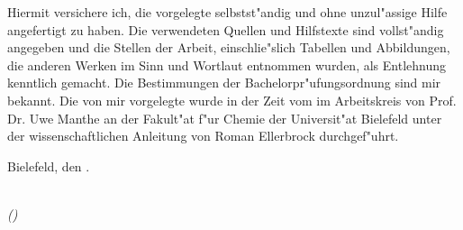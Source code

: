 \begin{large}

\vspace*{2cm}
\noindent
Hiermit versichere ich, die vorgelegte \workTyp selbstst"andig und ohne unzul"assige Hilfe angefertigt zu haben. Die verwendeten Quellen und Hilfstexte sind vollst"andig angegeben und die Stellen der Arbeit, einschlie"slich Tabellen und Abbildungen, die anderen Werken im Sinn und Wortlaut entnommen wurden, als Entlehnung kenntlich gemacht. Die Bestimmungen der Bachelorpr"ufungsordnung sind mir bekannt. Die von mir vorgelegte \workTyp wurde in der Zeit vom \workZeitraum im Arbeitskreis von Prof. Dr. Uwe Manthe an der Fakult"at f"ur Chemie der Universit"at Bielefeld unter der wissenschaftlichen Anleitung von Roman Ellerbrock durchgef"uhrt.

\vspace{2cm}

\noindent
Bielefeld, den \workDatum .

\vspace{3cm}

\hspace*{7cm}
\dotfill\\
\hspace*{8.5cm}
\textit{(\workNameStudent)}

\end{large}
